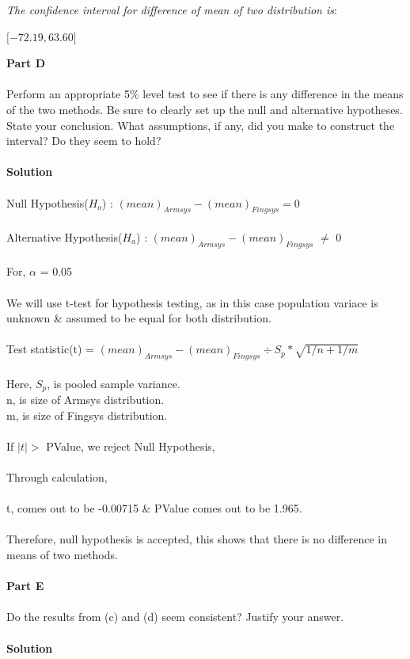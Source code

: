\documentclass[12pt,a4paper]{report}
\begin{document}
\textit{The confidence interval for difference of mean of two distribution is}:\\
\begin{center}
$\lbrack -72.19, 63.60 \rbrack$
\end{center}
\textbf{Part D}
\\\\
Perform an appropriate 5\% level test to see if there is any difference in the means of the two methods. Be sure to clearly set up the null and alternative hypotheses. State your conclusion. What assumptions, if any, did you make to construct the interval? Do they seem to hold?
\\\\
\textbf{Solution}
\\\\
Null Hypothesis($H_o$) : $(mean)_{Armsys} - (mean)_{Fingsys} = 0$\\\\
Alternative Hypothesis($H_a$) : $(mean)_{Armsys} - (mean)_{Fingsys}$  $\neq$ 0\\\\
For, $\alpha$ = 0.05
\\\\
We will use t-test for hypothesis testing, as in this case population variace is unknown \& assumed to be equal for both distribution.\\\\
Test statistic(t) = $(mean)_{Armsys} - (mean)_{Fingsys} \div S_p * \sqrt{1/n + 1/m}$\\\\
Here, $S_p$, is pooled sample variance.\\
n, is size of Armsys distribution.\\
m, is size of Fingsys distribution.\\
\\
If $\mid t \mid >$ PValue, we reject Null Hypothesis,\\\\
Through calculation,\\\\
t, comes out to be -0.00715 \& PValue comes out to be 1.965.\\\\
Therefore, null hypothesis is accepted, this shows that there is no difference in means of two methods.
\\\\
\textbf{Part E}
\\\\
Do the results from (c) and (d) seem consistent? Justify your answer.
\\\\
\textbf{Solution}
\\\\
\\\\
\end{document}

